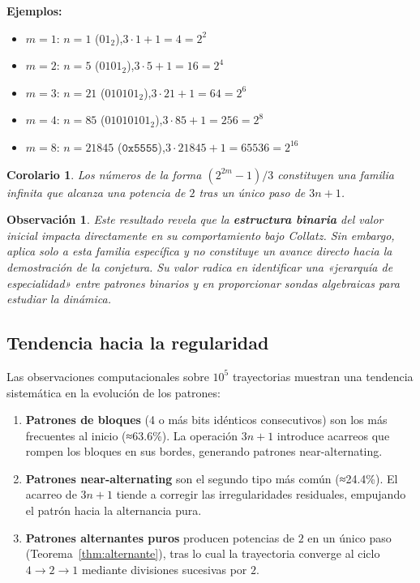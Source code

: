 \documentclass[11pt,a4paper]{article}
\newtheorem{corollary}[theorem]{Corolario}
\newtheorem{remark}[theorem]{Observación}
\begin{document}
\textbf{Ejemplos:}
\begin{itemize}[noitemsep]
  \item $m=1$: $n=1$\; ($01_2$),\quad $3\cdot1+1 = 4 = 2^2$
  \item $m=2$: $n=5$\; ($0101_2$),\quad $3\cdot5+1 = 16 = 2^4$
  \item $m=3$: $n=21$\; ($010101_2$),\quad $3\cdot21+1 = 64 = 2^6$
  \item $m=4$: $n=85$\; ($01010101_2$),\quad $3\cdot85+1 = 256 = 2^8$
  \item $m=8$: $n=21845$\; ($\mathtt{0x5555}$),\quad $3\cdot21845+1 = 65536 = 2^{16}$
\end{itemize}

\begin{corollary}
Los números de la forma $(2^{2m}-1)/3$ constituyen una familia infinita
que alcanza una potencia de $2$ tras un \emph{único} paso de $3n+1$.
\end{corollary}

\begin{remark}
Este resultado revela que la \textbf{estructura binaria} del valor inicial
impacta directamente en su comportamiento bajo Collatz.
Sin embargo, aplica solo a esta familia específica y no constituye
un avance directo hacia la demostración de la conjetura.
Su valor radica en identificar una «jerarquía de especialidad»
entre patrones binarios y en proporcionar sondas algebraicas
para estudiar la dinámica.
\end{remark}

\subsection{Tendencia hacia la regularidad}

Las observaciones computacionales sobre $10^5$ trayectorias muestran
una tendencia sistemática en la evolución de los patrones:

\begin{enumerate}
  \item \textbf{Patrones de bloques} (4 o más bits idénticos consecutivos)
        son los más frecuentes al inicio (≈63.6\%).
        La operación $3n+1$ introduce acarreos que rompen los bloques
        en sus bordes, generando patrones near-alternating.
  \item \textbf{Patrones near-alternating} son el segundo tipo más
        común (≈24.4\%).
        El acarreo de $3n+1$ tiende a corregir las irregularidades
        residuales, empujando el patrón hacia la alternancia pura.
  \item \textbf{Patrones alternantes puros} producen potencias de $2$
        en un único paso (Teorema~\ref{thm:alternante}),
        tras lo cual la trayectoria converge al ciclo $4{\to}2{\to}1$
        mediante divisiones sucesivas por $2$.
\end{enumerate}
\end{document}
